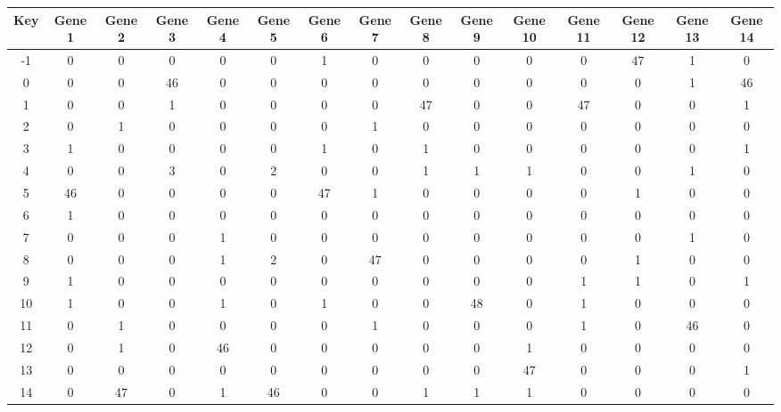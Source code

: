 \begin{tabular}{|c|c|c|c|c|c|c|c|c|c|c|c|c|c|c|}
\hline
Key & Gene 1 & Gene 2 & Gene 3 & Gene 4 & Gene 5 & Gene 6 & Gene 7 & Gene 8 & Gene 9 & Gene 10 & Gene 11 & Gene 12 & Gene 13 & Gene 14 \\
\hline
-1 & 0 & 0 & 0 & 0 & 0 & 1 & 0 & 0 & 0 & 0 & 0 & 47 & 1 & 0 \\
0 & 0 & 0 & 46 & 0 & 0 & 0 & 0 & 0 & 0 & 0 & 0 & 0 & 1 & 46 \\
1 & 0 & 0 & 1 & 0 & 0 & 0 & 0 & 47 & 0 & 0 & 47 & 0 & 0 & 1 \\
2 & 0 & 1 & 0 & 0 & 0 & 0 & 1 & 0 & 0 & 0 & 0 & 0 & 0 & 0 \\
3 & 1 & 0 & 0 & 0 & 0 & 1 & 0 & 1 & 0 & 0 & 0 & 0 & 0 & 1 \\
4 & 0 & 0 & 3 & 0 & 2 & 0 & 0 & 1 & 1 & 1 & 0 & 0 & 1 & 0 \\
5 & 46 & 0 & 0 & 0 & 0 & 47 & 1 & 0 & 0 & 0 & 0 & 1 & 0 & 0 \\
6 & 1 & 0 & 0 & 0 & 0 & 0 & 0 & 0 & 0 & 0 & 0 & 0 & 0 & 0 \\
7 & 0 & 0 & 0 & 1 & 0 & 0 & 0 & 0 & 0 & 0 & 0 & 0 & 1 & 0 \\
8 & 0 & 0 & 0 & 1 & 2 & 0 & 47 & 0 & 0 & 0 & 0 & 1 & 0 & 0 \\
9 & 1 & 0 & 0 & 0 & 0 & 0 & 0 & 0 & 0 & 0 & 1 & 1 & 0 & 1 \\
10 & 1 & 0 & 0 & 1 & 0 & 1 & 0 & 0 & 48 & 0 & 1 & 0 & 0 & 0 \\
11 & 0 & 1 & 0 & 0 & 0 & 0 & 1 & 0 & 0 & 0 & 1 & 0 & 46 & 0 \\
12 & 0 & 1 & 0 & 46 & 0 & 0 & 0 & 0 & 0 & 1 & 0 & 0 & 0 & 0 \\
13 & 0 & 0 & 0 & 0 & 0 & 0 & 0 & 0 & 0 & 47 & 0 & 0 & 0 & 1 \\
14 & 0 & 47 & 0 & 1 & 46 & 0 & 0 & 1 & 1 & 1 & 0 & 0 & 0 & 0 \\
\hline
\end{tabular}
